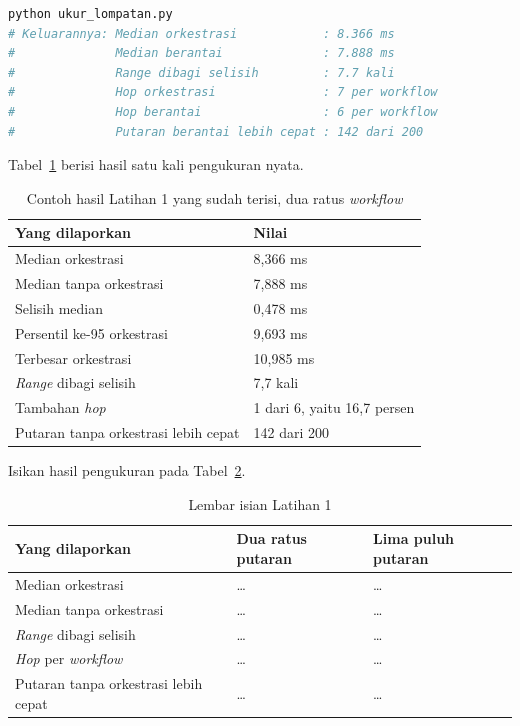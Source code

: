 \begin{lstlisting}[language=bash, caption={Mengukur tambahan \textit{hop} dan
  latensi, skrip tersedia di \berkas{sources/chapter12/ukur_lompatan.py}},
  label=lst:jalankan-ukur-lompatan]
python ukur_lompatan.py
# Keluarannya: Median orkestrasi            : 8.366 ms
#              Median berantai              : 7.888 ms
#              Range dibagi selisih         : 7.7 kali
#              Hop orkestrasi               : 7 per workflow
#              Hop berantai                 : 6 per workflow
#              Putaran berantai lebih cepat : 142 dari 200
\end{lstlisting}

Tabel~\ref{tab:lat1odsoa-contoh} berisi hasil satu kali pengukuran nyata.

\begin{table}[htbp]
  \centering
  \caption{Contoh hasil Latihan 1 yang sudah terisi, dua ratus \textit{workflow}}
  \label{tab:lat1odsoa-contoh}
  \begin{tabularx}{\textwidth}{|X|l|}
    \hline
    \textbf{Yang dilaporkan} & \textbf{Nilai} \\
    \hline
    Median orkestrasi & 8,366 ms \\
    \hline
    Median tanpa orkestrasi & 7,888 ms \\
    \hline
    Selisih median & 0,478 ms \\
    \hline
    Persentil ke-95 orkestrasi & 9,693 ms \\
    \hline
    Terbesar orkestrasi & 10,985 ms \\
    \hline
    \textit{Range} dibagi selisih & 7,7 kali \\
    \hline
    Tambahan \textit{hop} & 1 dari 6, yaitu 16,7 persen \\
    \hline
    Putaran tanpa orkestrasi lebih cepat & 142 dari 200 \\
    \hline
  \end{tabularx}
\end{table}

Isikan hasil pengukuran pada Tabel~\ref{tab:lat1odsoa-hasil}.

\begin{table}[htbp]
  \centering
  \caption{Lembar isian Latihan 1}
  \label{tab:lat1odsoa-hasil}
  \begin{tabularx}{\textwidth}{|X|l|l|}
    \hline
    \textbf{Yang dilaporkan} & \textbf{Dua ratus putaran} & \textbf{Lima puluh putaran} \\
    \hline
    Median orkestrasi & \dots & \dots \\
    \hline
    Median tanpa orkestrasi & \dots & \dots \\
    \hline
    \textit{Range} dibagi selisih & \dots & \dots \\
    \hline
    \textit{Hop} per \textit{workflow} & \dots & \dots \\
    \hline
    Putaran tanpa orkestrasi lebih cepat & \dots & \dots \\
    \hline
  \end{tabularx}
\end{table}

